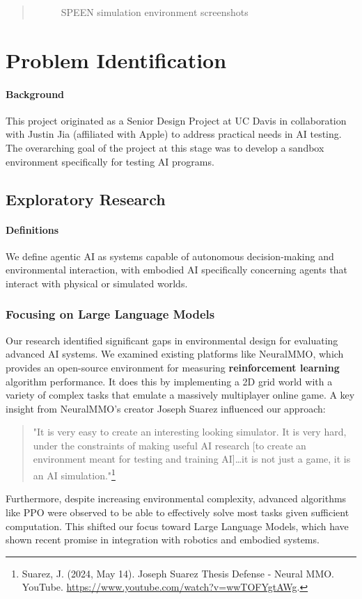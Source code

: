 \documentclass{article}
\begin{document}
\begin{abstract}
\begin{figure}[ht!]
\begin{minipage}[b]{0.47\textwidth}
        \end{minipage}
        \caption{SPEEN simulation environment screenshots}
        \label{fig:speen-environment}
    \end{figure}
\end{abstract}

\section{Problem Identification}

\paragraph{Background}
This project originated as a Senior Design Project at UC Davis in collaboration with Justin Jia (affiliated with Apple) to address practical needs in AI testing.
The overarching goal of the project at this stage was to develop a sandbox environment specifically for testing AI programs.

\subsection{Exploratory Research}

\paragraph{Definitions}
We define agentic AI as systems capable of autonomous decision-making and environmental interaction, with embodied AI specifically concerning agents that interact with physical or simulated worlds.

\subsubsection{Focusing on Large Language Models}
Our research identified significant gaps in environmental design for evaluating advanced AI systems.
We examined existing platforms like NeuralMMO, which provides an open-source environment for measuring \textbf{reinforcement learning} algorithm performance.
It does this by implementing a 2D grid world with a variety of complex tasks that emulate a massively multiplayer online game.
A key insight from NeuralMMO's creator Joseph Suarez influenced our approach:
\begin{quote}
    "It is very easy to create an interesting looking simulator. It is very hard, under the constraints of making useful AI research [to create an environment meant for testing and training AI]…it is not just a game, it is an AI simulation."\footnote{Suarez, J. (2024, May 14). Joseph Suarez Thesis Defense - Neural MMO. YouTube. \url{https://www.youtube.com/watch?v=wwTOFYgtAWg}.}
\end{quote}
Furthermore, despite increasing environmental complexity, advanced algorithms like PPO were observed to be able to effectively solve most tasks given sufficient computation.
This shifted our focus toward Large Language Models, which have shown recent promise in integration with robotics and embodied systems.
\end{document}
